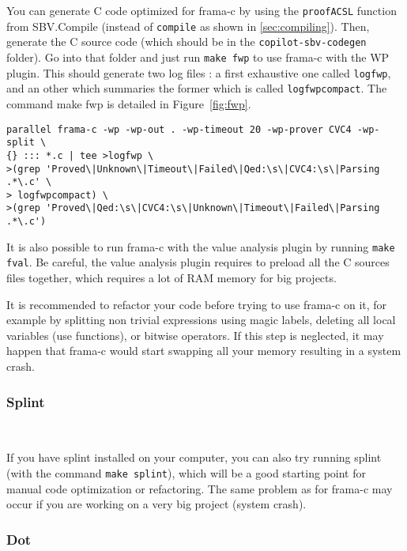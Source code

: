 You can generate C code optimized for frama-c by using the \texttt{proofACSL} function from SBV.Compile (instead of \texttt{compile} as shown in \ref{sec:compiling}). 
Then, generate the C source code (which should be in the \texttt{copilot-sbv-codegen} folder). Go into that folder and just run \texttt{make fwp} to use frama-c with the WP plugin. This should generate two log files : a first exhaustive one called \texttt{logfwp}, and an other which summaries the former which is called \texttt{logfwpcompact}. The command make fwp is detailed in Figure~\ref{fig:fwp}.

\begin{figure*}[!htb]
	\begin{lstlisting}[frame=none]
parallel frama-c -wp -wp-out . -wp-timeout 20 -wp-prover CVC4 -wp-split \
{} ::: *.c | tee >logfwp \
>(grep 'Proved\|Unknown\|Timeout\|Failed\|Qed:\s\|CVC4:\s\|Parsing .*\.c' \
> logfwpcompact) \
>(grep 'Proved\|Qed:\s\|CVC4:\s\|Unknown\|Timeout\|Failed\|Parsing .*\.c')

	\end{lstlisting}
	\caption{The bash command.}
	\label{fig:fwp}
\end{figure*} 

It is also possible to run frama-c with the value analysis plugin by running \texttt{make fval}. Be careful, the value analysis plugin requires to preload all the C sources files together, which requires a lot of RAM memory for big projects.

It is recommended to refactor your code before trying to use frama-c on it, for example by splitting non trivial expressions using magic labels, deleting all local variables (use functions), or bitwise operators. If this step is neglected, it may happen that frama-c would start swapping all your memory resulting in a system crash.

\subsubsection{Splint}~\label{subsec:splint} 

If you have splint installed on your computer, you can also try running splint (with the command \texttt{make splint}), which will be a good starting point for manual code optimization or refactoring. The same problem as for frama-c may occur if you are working on a very big project (system crash).

\subsubsection{Dot}~\label{subsec:dot} 

